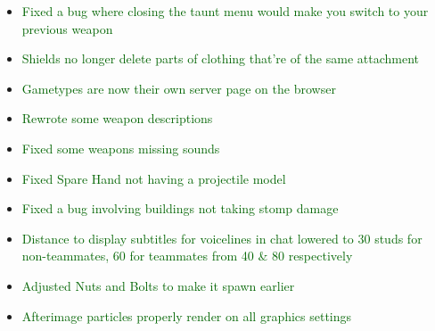 \documentclass{article}
\begin{document}
\begin{itemize}
    \item \textcolor{darkgreen}{Fixed a bug where closing the taunt menu would make you switch to your previous weapon}
    \item \textcolor{darkgreen}{Shields no longer delete parts of clothing that’re of the same attachment}
    \item \textcolor{darkgreen}{Gametypes are now their own server page on the browser}
    \item \textcolor{darkgreen}{Rewrote some weapon descriptions}
    \item \textcolor{darkgreen}{Fixed some weapons missing sounds}
    \item \textcolor{darkgreen}{Fixed Spare Hand not having a projectile model}
    \item \textcolor{darkgreen}{Fixed a bug involving buildings not taking stomp damage}
    \item \textcolor{darkgreen}{Distance to display subtitles for voicelines in chat lowered to 30 studs for non-teammates, 60 for teammates from 40 \& 80 respectively}
    \item \textcolor{darkgreen}{Adjusted Nuts and Bolts to make it spawn earlier}
    \item \textcolor{darkgreen}{Afterimage particles properly render on all graphics settings}
\end{itemize}
\end{document}
